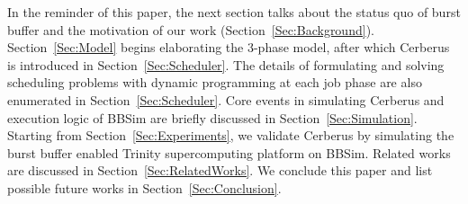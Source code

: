 In the reminder of this paper,
the next section talks about the status quo of burst buffer and
the motivation of our work (Section~\ref{Sec:Background}).
Section~\ref{Sec:Model} begins elaborating the 3-phase model,
after which Cerberus is introduced in Section~\ref{Sec:Scheduler}.
The details of formulating and solving scheduling problems with
dynamic programming at each job phase are also
enumerated in Section~\ref{Sec:Scheduler}.
Core events in simulating Cerberus and execution logic of BBSim are
briefly discussed in Section~\ref{Sec:Simulation}.
Starting from Section~\ref{Sec:Experiments}, we validate Cerberus
by simulating the burst buffer enabled Trinity supercomputing platform on BBSim.
Related works are discussed in Section~\ref{Sec:RelatedWorks}.
We conclude this paper and list possible future works in Section~\ref{Sec:Conclusion}.

